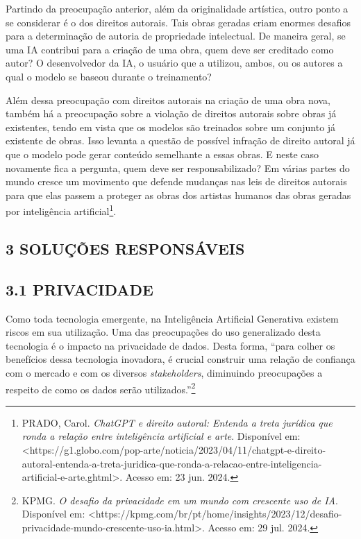 Partindo da preocupação anterior, além da originalidade artística, outro ponto a se considerar é o dos direitos autorais. Tais obras geradas criam enormes desafios para a determinação de autoria de propriedade intelectual. De maneira geral, se uma IA contribui para a criação de uma obra, quem deve ser creditado como autor? O desenvolvedor da IA, o usuário que a utilizou, ambos, ou os autores a qual o modelo se baseou durante o treinamento?

Além dessa preocupação com direitos autorais na criação de uma obra nova, também há a preocupação sobre a violação de direitos autorais sobre obras já existentes, tendo em vista que os modelos são treinados sobre um conjunto já existente de obras. Isso levanta a questão de possível infração de direito autoral já que o modelo pode gerar conteúdo semelhante a essas obras. E neste caso novamente fica a pergunta, quem deve ser responsabilizado? Em várias partes do mundo cresce um movimento que defende mudanças nas leis de direitos autorais para que elas passem a proteger as obras dos artistas humanos das obras geradas por inteligência artificial\footnote{PRADO, Carol. \textit{ChatGPT e direito autoral: Entenda a treta jurídica que ronda a relação entre inteligência artificial e arte}. Disponível em: <https://g1.globo.com/pop-arte/noticia/2023/04/11/chatgpt-e-direito-autoral-entenda-a-treta-juridica-que-ronda-a-relacao-entre-inteligencia-artificial-e-arte.ghtml>. Acesso em: 23 jun. 2024.}. 


\subsection*{\textbf{3 SOLUÇÕES RESPONSÁVEIS}}
\subsection*{{3.1 PRIVACIDADE}}
Como toda tecnologia emergente, na Inteligência Artificial Generativa existem riscos em sua utilização. Uma das preocupações do uso generalizado desta tecnologia é o impacto na privacidade de dados. Desta forma, “para colher os benefícios dessa tecnologia inovadora, é crucial construir uma relação de confiança com o mercado e com os diversos \textit{stakeholders}, diminuindo preocupações a respeito de como os dados serão utilizados.”\footnote{KPMG. \textit{O desafio da privacidade em um mundo com crescente uso de IA}. Disponível em: <https://kpmg.com/br/pt/home/insights/2023/12/desafio-privacidade-mundo-crescente-uso-ia.html>. Acesso em: 29 jul. 2024.}

